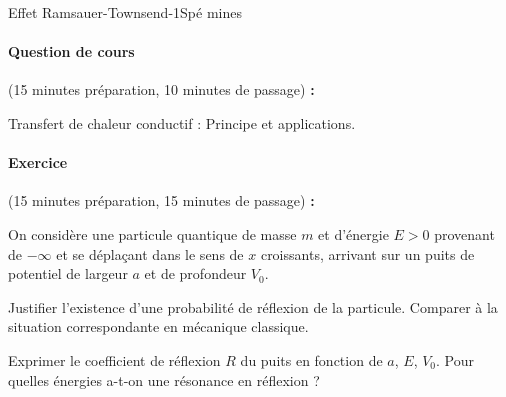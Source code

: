 \begin{exercise}{Effet Ramsauer-Townsend}{-1}{Spé}
{}{mines}

\paragraph{Question de cours} \textsf{(15 minutes préparation, 10 minutes de passage) \textbf{:}}

Transfert de chaleur conductif : Principe et applications.

\paragraph{Exercice} \textsf{(15 minutes préparation, 15 minutes de passage) \textbf{:}}

On considère une particule quantique de masse $m$ et d'énergie $E > 0$ provenant de $-\infty$ et  se déplaçant dans le sens de $x$ croissants, arrivant sur un puits de potentiel de largeur $a$ et de profondeur $V_0$.


\begin{center}
\end{center}

\begin{questions}
\question Justifier l'existence d'une probabilité de réflexion de la particule. Comparer à la situation correspondante en mécanique classique.

\question Exprimer le coefficient de réflexion $R$ du puits en fonction de $a$, $E$, $V_0$. Pour quelles énergies a-t-on une résonance en réflexion ?
\end{questions}


\end{exercise}
